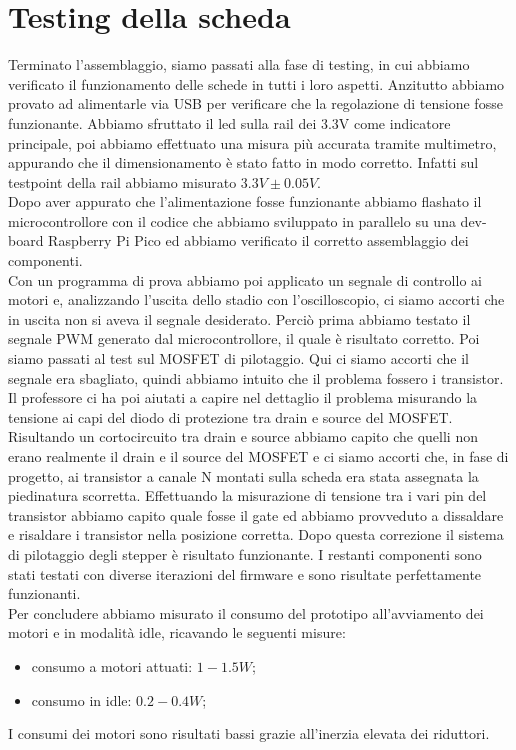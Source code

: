 \chapter{Testing della scheda}

Terminato l’assemblaggio, siamo passati alla fase di testing, in cui abbiamo verificato il funzionamento delle schede in tutti i loro aspetti.
Anzitutto abbiamo provato ad alimentarle via USB per verificare che la regolazione di tensione fosse funzionante. Abbiamo sfruttato il led sulla rail dei 3.3V come indicatore principale, poi abbiamo effettuato una misura più accurata tramite multimetro, appurando che il dimensionamento è stato fatto in modo corretto. Infatti sul testpoint della rail abbiamo misurato $3.3V \pm 0.05V$. \\
Dopo aver appurato che l’alimentazione fosse funzionante abbiamo flashato il microcontrollore con il codice che abbiamo sviluppato in parallelo su una dev-board Raspberry Pi Pico ed abbiamo verificato il corretto assemblaggio dei componenti. \\
Con un programma di prova abbiamo poi applicato un segnale di controllo ai motori e, analizzando l’uscita dello stadio con l’oscilloscopio, ci siamo accorti che in uscita non si aveva il segnale desiderato. Perciò prima abbiamo testato il segnale PWM generato dal microcontrollore, il quale è risultato corretto. Poi siamo passati al test sul MOSFET di pilotaggio. Qui ci siamo accorti che il segnale era sbagliato, quindi abbiamo intuito che il problema fossero i transistor. Il professore ci ha poi aiutati a capire nel dettaglio il problema misurando la tensione ai capi del diodo di protezione tra drain e source del MOSFET. Risultando un cortocircuito tra drain e source abbiamo capito che quelli non erano realmente il drain e il source del MOSFET e ci siamo accorti che, in fase di progetto, ai transistor a canale N montati sulla scheda era stata assegnata la piedinatura scorretta. Effettuando la misurazione di tensione tra i vari pin del transistor abbiamo capito quale fosse il gate ed abbiamo provveduto a dissaldare e risaldare i transistor nella posizione corretta. Dopo questa correzione il sistema di pilotaggio degli stepper è risultato funzionante.
I restanti componenti sono stati testati con diverse iterazioni del firmware e sono risultate perfettamente funzionanti. \\
Per concludere abbiamo misurato il consumo del prototipo all’avviamento dei motori e in modalità idle,  ricavando le seguenti misure:

\begin{itemize}
    \item consumo a motori attuati: $1-1.5 W$;
    \item consumo in idle: $0.2-0.4 W$;
\end{itemize}
I consumi dei motori sono risultati bassi grazie all’inerzia elevata dei riduttori.

